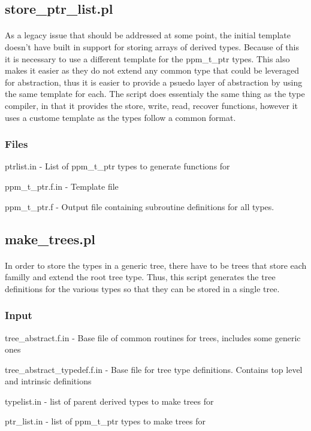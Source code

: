 \documentclass{article}
\begin{document}
\subsection{store\_ptr\_list.pl}
\paragraph{}
As a legacy issue that should be addressed at some point, the initial template doesn't have built in support for storing arrays of derived types. Because of this it is necessary to use a different template for the ppm\_t\_ptr types. This also makes it easier as they do not extend any common type that could be leveraged for abstraction, thus it is easier to provide a psuedo layer of abstraction by using the same template for each. The script does essentialy the same thing as the type compiler, in that it provides the store, write, read, recover functions, however it uses a custome template as the types follow a common format.
\subsubsection{Files}
\begin{list}{}{}
\item ptrlist.in - List of ppm\_t\_ptr types to generate functions for
\item ppm\_t\_ptr.f.in - Template file
\item ppm\_t\_ptr.f - Output file containing subroutine definitions for all types.
\end{list}

\subsection{make\_trees.pl}
\paragraph{}
In order to store the types in a generic tree, there have to be trees that store each familly and extend the root tree type. Thus, this script generates the tree definitions for the various types so that they can be stored in a single tree.
\subsubsection{Input}
\begin{list}{}{}
\item tree\_abstract.f.in - Base file of common routines for trees, includes some generic ones
\item tree\_abstract\_typedef.f.in - Base file for tree type definitions. Contains top level and intrinsic definitions
\item typelist.in - list of parent derived types to make trees for
\item ptr\_list.in - list of ppm\_t\_ptr types to make trees for
\end{list}
\end{document}

